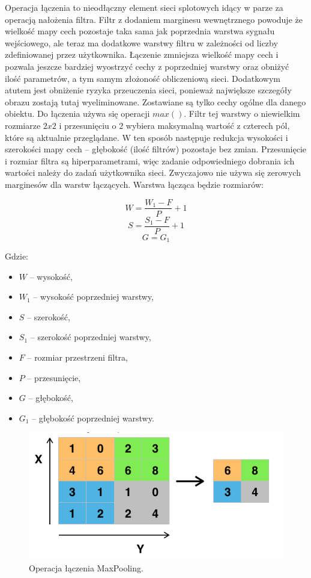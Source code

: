 \documentclass[12pt,a4paper,twoside,titlepage,openright]{book}
\begin{document}
\begin{itemize}
Operacja łączenia to nieodłączny element sieci splotowych idący w parze za operacją nałożenia filtra. Filtr z dodaniem marginesu wewnętrznego  powoduje że wielkość mapy cech pozostaje taka sama jak poprzednia warstwa sygnału wejściowego, ale teraz ma dodatkowe warstwy filtru w zależności od liczby zdefiniowanej przez użytkownika. Łączenie zmniejsza wielkość mapy cech i pozwala jeszcze bardziej wyostrzyć cechy z poprzedniej warstwy oraz obniżyć ilość parametrów, a tym samym złożoność obliczeniową sieci. Dodatkowym atutem jest obniżenie ryzyka przeuczenia sieci, ponieważ największe szczegóły obrazu zostają tutaj wyeliminowane. Zostawiane są tylko cechy ogólne dla danego obiektu. Do łączenia używa się operacji $max()$. Filtr tej warstwy o niewielkim rozmiarze \(2x2\) i przesunięciu o \(2\) wybiera maksymalną wartość z czterech pól, które są aktualnie przeglądane. W ten sposób następuje redukcja wysokości i szerokości mapy cech -- głębokość (ilość filtrów) pozostaje  bez zmian. Przesunięcie i rozmiar filtra są hiperparametrami, więc zadanie odpowiedniego dobrania ich wartości należy do zadań użytkownika sieci. Zwyczajowo nie używa się zerowych marginesów dla warstw łączących. Warstwa łącząca będzie rozmiarów:

$$ W = \frac{W_1 - F}{P} + 1 $$
$$ S = \frac{S_1 - F}{P} + 1 $$
$$ G = G_1 $$

Gdzie:
\begin{itemize}
\item $W$ -- wysokość,
\item $W_1$ -- wysokość poprzedniej warstwy,
\item $S$ -- szerokość,
\item $S_1$ -- szerokość poprzedniej warstwy,
\item $F$ -- rozmiar przestrzeni filtra,
\item $P$ -- przesunięcie,
\item $G$ -- głębokość,
\item $G_1$ -- głębokość poprzedniej warstwy.
\end{itemize}

\begin{figure}[ht]
	\centering
			\includegraphics[resolution=100, scale=0.6]{MaxPooling.png}
		\caption{Operacja łączenia MaxPooling.}
\end{figure}


\end{itemize}
\end{document}
